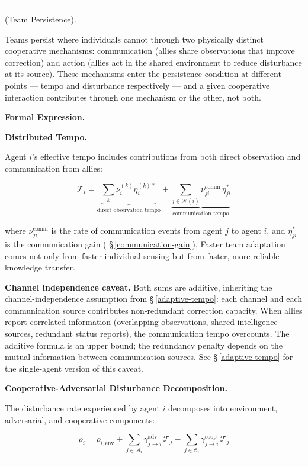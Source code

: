 \documentclass[11pt,oneside]{article}
\newcounter{claim}[section]
\renewcommand{\theclaim}{\thesection.\arabic{claim}}
\newenvironment{segment}[2]{%
  \refstepcounter{claim}%
  \bigskip\noindent\hrule\smallskip
  \noindent{\bfseries #1~\theclaim}\enskip(#2).\par\smallskip
  \noindent\ignorespaces
}{%
  \par\smallskip\noindent\hrule\bigskip
}
\newenvironment{proposition}[1][]{\begin{segment}{Proposition}{#1}}{\end{segment}}
\begin{document}
\begin{proposition}[Team Persistence]
\label{team-persistence}
Teams persist where individuals cannot through two physically distinct cooperative mechanisms: communication (allies share observations that improve correction) and action (allies act in the shared environment to reduce disturbance at its source). These mechanisms enter the persistence condition at different points — tempo and disturbance respectively — and a given cooperative interaction contributes through one mechanism or the other, not both.



\medskip\noindent\textbf{Formal Expression.}



\medskip\noindent\textbf{Distributed Tempo.}



Agent $i$'s effective tempo includes contributions from both direct observation and communication from allies:

$$\mathcal{T}_i = \underbrace{\sum_k \nu_i^{(k)} \eta_i^{(k)*}}_{\text{direct observation tempo}} + \underbrace{\sum_{j \in \mathcal{N}(i)} \nu_{ji}^{\text{comm}} \, \eta_{ji}^*}_{\text{communication tempo}}$$

where $\nu_{ji}^{\text{comm}}$ is the rate of communication events from agent $j$ to agent $i$, and $\eta_{ji}^*$ is the communication gain ( \S\,\ref{communication-gain}). Faster team adaptation comes not only from faster individual sensing but from faster, more reliable knowledge transfer.

\textbf{Channel independence caveat.} Both sums are additive, inheriting the channel-independence assumption from \S\,\ref{adaptive-tempo}: each channel and each communication source contributes non-redundant correction capacity. When allies report correlated information (overlapping observations, shared intelligence sources, redundant status reports), the communication tempo overcounts. The additive formula is an upper bound; the redundancy penalty depends on the mutual information between communication sources. See \S\,\ref{adaptive-tempo} for the single-agent version of this caveat.


\medskip\noindent\textbf{Cooperative-Adversarial Disturbance Decomposition.}



The disturbance rate experienced by agent $i$ decomposes into environment, adversarial, and cooperative components:

$$\rho_i = \rho_{i,\text{env}} + \sum_{j \in \mathcal{A}_i} \gamma_{j \to i}^{\text{adv}} \, \mathcal{T}_j - \sum_{j \in \mathcal{C}_i} \gamma_{j \to i}^{\text{coop}} \, \mathcal{T}_j$$


\end{proposition}
\end{document}
